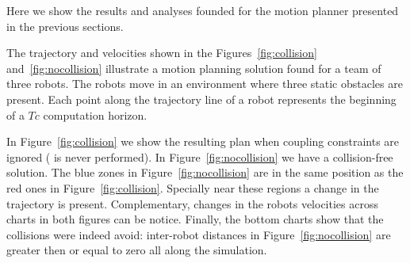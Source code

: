 \documentclass[eprint]{actapoly}
\begin{document}
Here we show the results and analyses founded for the motion planner presented
in the previous sections.

The trajectory and velocities shown in the Figures~\ref{fig:collision} and~\ref{fig:nocollision}
illustrate a motion planning solution found for a team of three robots.
The robots move in an environment where three static obstacles are present.
Each point along the trajectory line of a robot represents the beginning
of a $Tc$ computation horizon.

In Figure~\ref{fig:collision} we show the resulting plan when coupling constraints
are ignored ( is never performed). In Figure~\ref{fig:nocollision}
we have a collision-free solution. The blue zones in Figure~\ref{fig:nocollision} are in the same position as the red ones in Figure~\ref{fig:collision}. Specially near these regions a change in the trajectory is present. Complementary, changes in the robots velocities across charts in both figures can be notice. Finally, the bottom charts show that the collisions were indeed avoid: inter-robot distances in Figure~\ref{fig:nocollision} are greater then or equal to zero all along the simulation.

\end{document}
